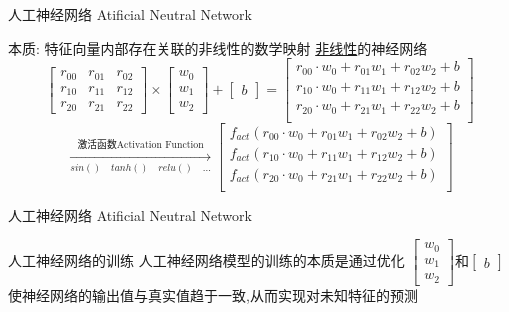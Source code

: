 \documentclass{beamer}
\begin{document}
\begin{frame} {人工神经网络 Atificial Neutral Network} 

\begin{block}{本质: \mbox{\color{yellow}特征向量内部存在关联}的\mbox{\color{red}非线性}的数学映射}
    \mbox{\underline{非线性}的神经网络}
    $${
    \begin{bmatrix}
    r_{00}&r_{01}&r_{02}\\
    r_{10}&r_{11}&r_{12}\\
    r_{20}&r_{21}&r_{22}
    \end{bmatrix} \times
    \begin{bmatrix}
    w_0\\w_1\\w_2
    \end{bmatrix} +
    \begin{bmatrix}
    b
    \end{bmatrix} =
    \begin{bmatrix}
    r_{00} \cdot w_0+r_{01}w_1+r_{02}w_2+b \\
    r_{10} \cdot w_0+r_{11}w_1+r_{12}w_2+b \\
    r_{20} \cdot w_0+r_{21}w_1+r_{22}w_2+b \\
    \end{bmatrix}
    }$$
    $${
    \xrightarrow[sin() \quad tanh() \quad relu() \quad...]{\mbox{激活函数Activation Function}}
    \begin{bmatrix}
    f_{act}(r_{00} \cdot w_0+r_{01}w_1+r_{02}w_2+b) \\
    f_{act}(r_{10} \cdot w_0+r_{11}w_1+r_{12}w_2+b) \\
    f_{act}(r_{20} \cdot w_0+r_{21}w_1+r_{22}w_2+b) \\
    \end{bmatrix}    
    }$$
    
    \begin{center}
    \end{center}
\end{block}

\end{frame}



\begin{frame} {人工神经网络 Atificial Neutral Network} 

\begin{block}{人工神经网络的训练}
    人工神经网络模型的训练的本质是通过优化
    $\begin{bmatrix}w_0\\w_1\\w_2\end{bmatrix}$和$\begin{bmatrix}b\end{bmatrix}$
    使神经网络的输出值与真实值趋于一致,从而实现对未知特征的预测
\end{block}

\end{frame}
\end{document}

